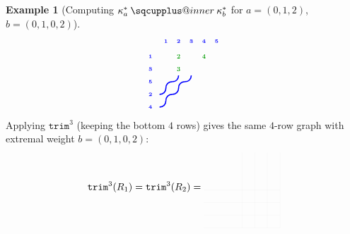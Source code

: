 \documentclass[a4paper,fleqn]{cas-sc}
\makeatletter
\newcommand{\sqcupplus@inner}[2]{%
  \vcenter{\hbox{\ooalign{%
    \hfil$\m@th#1\sqcup$\hfil\cr
    \hfil\raisebox{0.15ex}{$\m@th#1\scriptscriptstyle+$}\hfil\cr
  }}}%
}
\newcommand{\sqcupplus}{\mathbin{\mathpalette\sqcupplus@inner\relax}}
\theoremstyle{definition}
\newtheorem{example}[lemma]{Example}
\theoremstyle{remark}
\numberwithin{equation}{subsection}
\newcommand{\trm}{\mathtt{trim}}
\makeatother
\begin{document}
\begin{example}[Computing $\kappa_a^*\sqcupplus\kappa_b^*$ for $a=(0,1,2)$, $b=(0,1,0,2)$]
$$\begin{tikzpicture}[scale=0.45, baseline=(current bounding box.center)]
  \draw[blue, line width=1.125pt] (0.8,2) .. controls (0.8,2.3) and (1,2.5) .. (1.3,2.5);
  \draw[blue, line width=1.125pt] (1.3,2.5) .. controls (1.6,2.5) and (1.8,2.7) .. (1.8,3);
  \draw[blue, line width=1.125pt] (1.8,2) .. controls (1.8,2.3) and (2,2.5) .. (2.3,2.5);
  \draw[blue, line width=1.125pt] (2.3,2.5) .. controls (2.6,2.5) and (2.8,2.7) .. (2.8,3);
  \draw[blue, line width=1.125pt] (0.3,1.5) .. controls (0.6,1.5) and (0.8,1.7) .. (0.8,2);
  \draw[blue, line width=1.125pt] (0.8,1) .. controls (0.8,1.3) and (1,1.5) .. (1.3,1.5);
  \draw[blue, line width=1.125pt] (1.3,1.5) .. controls (1.6,1.5) and (1.8,1.7) .. (1.8,2);
  \draw[blue, line width=1.125pt] (0.3,0.5) .. controls (0.6,0.5) and (0.8,0.7) .. (0.8,1);
  \node[font=\tiny\bfseries, text=blue, anchor=south] at (0.8,5.3) {1};
  \node[font=\tiny\bfseries, text=blue, anchor=south] at (1.8,5.3) {2};
  \node[font=\tiny\bfseries, text=blue, anchor=south] at (2.8,5.3) {3};
  \node[font=\tiny\bfseries, text=blue, anchor=south] at (3.8,5.3) {4};
  \node[font=\tiny\bfseries, text=blue, anchor=south] at (4.8,5.3) {5};
  \node[font=\tiny\bfseries, text=blue, anchor=east] at (0,4.5) {1};
  \node[font=\tiny\bfseries, text=blue, anchor=east] at (0,3.5) {3};
  \node[font=\tiny\bfseries, text=blue, anchor=east] at (0,2.5) {5};
  \node[font=\tiny\bfseries, text=blue, anchor=east] at (0,1.5) {2};
  \node[font=\tiny\bfseries, text=blue, anchor=east] at (0,0.5) {4};
  \node[font=\Large\bfseries, text=green!60!black, fill=white, inner sep=0.5pt, circle, transform shape] at (1.8,4.5) {2};
  \node[font=\Large\bfseries, text=green!60!black, fill=white, inner sep=0.5pt, circle, transform shape] at (3.8,4.5) {4};
  \node[font=\Large\bfseries, text=green!60!black, fill=white, inner sep=0.5pt, circle, transform shape] at (1.8,3.5) {3};
\end{tikzpicture}
$$
Applying $\trm^3$ (keeping the bottom $4$ rows) gives the same $4$-row graph with extremal weight $b=(0,1,0,2)$:
$$\trm^3(R_1)=\trm^3(R_2)=
\begin{tikzpicture}[scale=0.45, baseline=(current bounding box.center)]
  \draw[lightgray, very thin, opacity=0.3] (6.3,0) -- (0.3,0);
  \draw[lightgray, very thin, opacity=0.3] (6.3,0) -- (6.3,6);
  \draw[lightgray, very thin, opacity=0.3] (6.3,1) -- (0.3,1);
  \draw[lightgray, very thin, opacity=0.3] (5.3,0) -- (5.3,6);
  \draw[lightgray, very thin, opacity=0.3] (6.3,2) -- (0.3,2);
  \draw[lightgray, very thin, opacity=0.3] (4.3,0) -- (4.3,6);
  \draw[lightgray, very thin, opacity=0.3] (6.3,3) -- (0.3,3);
  \draw[lightgray, very thin, opacity=0.3] (3.3,0) -- (3.3,6);

\end{tikzpicture}$$
\end{example}
\end{document}
